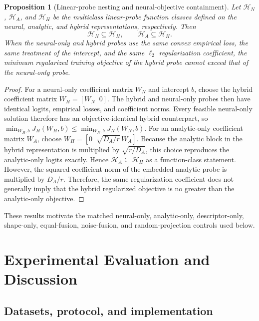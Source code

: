 \documentclass[pdflatex,sn-mathphys-num]{sn-jnl}
\newcommand{\1}{\mathbf{1}}
\theoremstyle{plain}
\newtheorem{proposition}{Proposition}
\begin{document}
	\begin{proposition}[Linear-probe nesting and neural-objective containment]
		\label{prop:nesting}
		Let $\mathcal{H}_N$, $\mathcal{H}_A$, and $\mathcal{H}_H$ be the
		multiclass linear-probe function classes defined on the neural,
		analytic, and hybrid representations, respectively. Then
		\begin{equation}
			\mathcal{H}_N\subseteq\mathcal{H}_H,
			\qquad
			\mathcal{H}_A\subseteq\mathcal{H}_H.
			\label{eq:probe_nesting}
		\end{equation}
		When the neural-only and hybrid probes use the same convex
		empirical loss, the same treatment of the intercept, and the same
		$\ell_2$ regularization coefficient, the minimum regularized training
		objective of the hybrid probe cannot exceed that of the neural-only
		probe.
	\end{proposition}
	
	\begin{proof}
		For a neural-only coefficient matrix $W_N$ and intercept $b$, choose the hybrid coefficient matrix $W_H=[W_N\;\;0]$.
		The hybrid and neural-only probes then have identical logits,
		empirical losses, and coefficient norms. Every feasible neural-only
		solution therefore has an objective-identical hybrid counterpart, so $\min_{W_H,b}J_H(W_H,b)\leq\min_{W_N,b}J_N(W_N,b)$. For an analytic-only coefficient matrix $W_A$, choose $W_H=[0\;\;\sqrt{D_A/r}\,W_A]$.
		Because the analytic block in the hybrid representation is multiplied
		by $\sqrt{r/D_A}$, this choice reproduces the analytic-only logits
		exactly. Hence
		$\mathcal{H}_A\subseteq\mathcal{H}_H$ as a function-class statement.
		However, the squared coefficient norm of the embedded analytic probe
		is multiplied by $D_A/r$. Therefore, the same regularization
		coefficient does not generally imply that the hybrid regularized
		objective is no greater than the analytic-only objective.
	\end{proof}
	
	These results motivate the matched neural-only, analytic-only, descriptor-only, shape-only, equal-fusion, noise-fusion, and random-projection controls used below.

	\section{Experimental Evaluation and Discussion}
	\label{sec:evaluation}
	
	\subsection{Datasets, protocol, and implementation}
	
\end{document}
